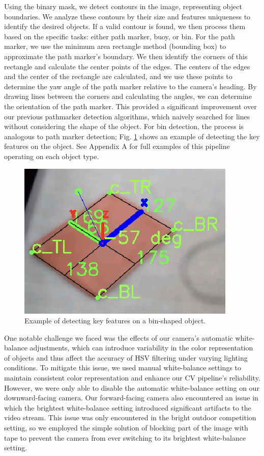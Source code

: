 \documentclass[conference]{IEEEtran}
\begin{document}
Using the binary mask, we detect contours in the image, representing object boundaries. We analyze these contours by their size and features uniqueness to identify the desired objects. If a valid contour is found, we then process them based on the specific tasks: either path marker, buoy, or bin. For the path marker, we use the minimum area rectangle method (bounding box) to approximate the path marker's boundary. We then identify the corners of this rectangle and calculate the center points of the edges. The centers of the edges and the center of the rectangle are calculated, and we use these points to determine the yaw angle of the path marker relative to the camera's heading. By drawing lines between the corners and calculating the angles, we can determine the orientation of the path marker. This provided a significant improvement over our previous pathmarker detection algorithms, which naively searched for lines without considering the shape of the object. For bin detection, the process is analogous to path marker detection; Fig. \ref{fig:bin_features} shows an example of detecting the key features on the object. See Appendix A for full examples of this pipeline operating on each object type.

\begin{figure}[htbp]
    \centerline{\includegraphics[scale=0.55]{images/bin_features.png}}
    \caption{Example of detecting key features on a bin-shaped object.}
    \label{fig:bin_features}
\end{figure}

One notable challenge we faced was the effects of our camera's automatic white-balance adjustments, which can introduce variability in the color representation of objects and thus affect the accuracy of HSV filtering under varying lighting conditions. To mitigate this issue, we used manual white-balance settings to maintain consistent color representation and enhance our CV pipeline's reliability. However, we were only able to disable the automatic white-balance setting on our downward-facing camera. Our forward-facing camera also encountered an issue in which the brightest white-balance setting introduced significant artifacts to the video stream. This issue was only encountered in the bright outdoor competition setting, so we employed the simple solution of blocking part of the image with tape to prevent the camera from ever switching to its brightest white-balance setting.
\end{document}

